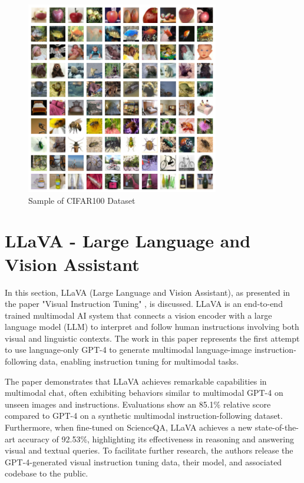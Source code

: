\documentclass[12pt, conference, compsoc, onecolumn]{IEEEtran}
\begin{document}
	\begin{figure}[H]
		\centering
		\includegraphics[width=0.75\textwidth]{figures/cifar100_sample.png}
		\caption{Sample of CIFAR100 Dataset\cite{Krizhevsky09cifar100}}
		\label{fig:cifar100}
	\end{figure}
	
	\newpage
	\section{LLaVA - Large Language and Vision Assistant}
	
	In this section, LLaVA (Large Language and Vision Assistant), as presented in the paper "Visual Instruction Tuning" \cite{liu2023llava}, is discussed. LLaVA is an end-to-end trained multimodal AI system that connects a vision encoder with a large language model (LLM) to interpret and follow human instructions involving both visual and linguistic contexts. The work in this paper represents the first attempt to use language-only GPT-4 to generate multimodal language-image instruction-following data, enabling instruction tuning for multimodal tasks.
	
	The paper demonstrates that LLaVA achieves remarkable capabilities in multimodal chat, often exhibiting behaviors similar to multimodal GPT-4 on unseen images and instructions. Evaluations show an 85.1\% relative score compared to GPT-4 on a synthetic multimodal instruction-following dataset. Furthermore, when fine-tuned on ScienceQA, LLaVA achieves a new state-of-the-art accuracy of 92.53\%, highlighting its effectiveness in reasoning and answering visual and textual queries. To facilitate further research, the authors release the GPT-4-generated visual instruction tuning data, their model, and associated codebase to the public.
	
\end{document}
